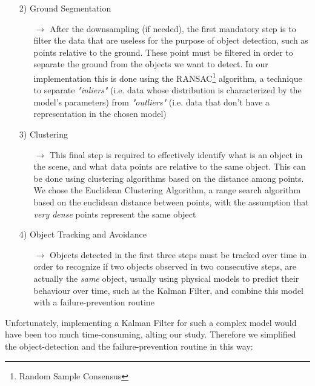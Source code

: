 \begin{itemize}
	\item[2)] Ground Segmentation
	\begin{itemize}
		\item[$\rightarrow$] After the downsampling (if needed), the first mandatory step is to filter the data that are useless for the purpose of object detection, such as points relative to the ground. These point must be filtered in order to separate the ground from the objects we want to detect.
		In our implementation this is done using the RANSAC\footnote{Random Sample Consensus} algorithm\cite{ransac}, a technique to separate \textsl{"inliers"} (i.e. data whose distribution is characterized by the model's parameters) from \textsl{"outliers"} (i.e. data that don't have a representation in the chosen model)
	\end{itemize}
\end{itemize}

\begin{itemize}
	\item[3)] Clustering
	\begin{itemize}
		\item[$\rightarrow$] This final step is required to effectively identify what is an object in the scene, and what data points are relative to the same object. This can be done using clustering algorithms based on the distance among points. We chose the Euclidean Clustering Algorithm, a range search algorithm based on the euclidean distance between points, with the assumption that \textsl{very dense} points represent the same object
	\end{itemize}
\end{itemize}

\begin{itemize}
	\item[4)] Object Tracking and Avoidance
	\begin{itemize}
		\item[$\rightarrow$] Objects detected in the first three steps must be tracked over time in order to recognize if two objects observed in two consecutive steps, are actually the \textsl{same} object, usually using physical models to predict their behaviour over time, such as the Kalman Filter, and combine this model with a failure-prevention routine
	\end{itemize}
\end{itemize}

Unfortunately, implementing a Kalman Filter for such a complex model would have been too much time-consuming, alting our study. Therefore we simplified the object-detection and the failure-prevention routine in this way:

